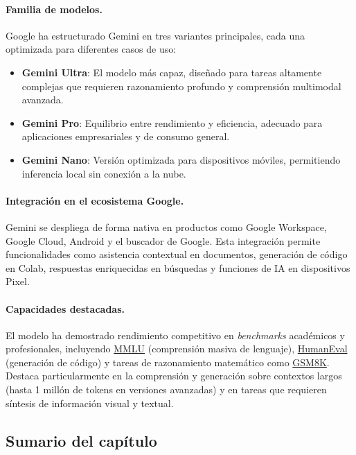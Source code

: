 \documentclass[12pt,a4paper]{report}
\numberwithin{figure}{section}
\begin{document}
\paragraph{Familia de modelos.}
Google ha estructurado Gemini en tres variantes principales, cada una optimizada para diferentes casos de uso:
\begin{itemize}
    \item \textbf{Gemini Ultra}: El modelo más capaz, diseñado para tareas altamente complejas que requieren razonamiento profundo y comprensión multimodal avanzada.
    \item \textbf{Gemini Pro}: Equilibrio entre rendimiento y eficiencia, adecuado para aplicaciones empresariales y de consumo general.
    \item \textbf{Gemini Nano}: Versión optimizada para dispositivos móviles, permitiendo inferencia local sin conexión a la nube.
\end{itemize}

\paragraph{Integración en el ecosistema Google.}
Gemini se despliega de forma nativa en productos como Google Workspace, Google Cloud, Android y el buscador de Google. Esta integración permite funcionalidades como asistencia contextual en documentos, generación de código en Colab, respuestas enriquecidas en búsquedas y funciones de IA en dispositivos Pixel.

\paragraph{Capacidades destacadas.}
El modelo ha demostrado rendimiento competitivo en \textit{benchmarks} académicos y profesionales, incluyendo \href{https://github.com/hendrycks/test}{MMLU} (comprensión masiva de lenguaje), \href{https://github.com/openai/human-eval}{HumanEval} (generación de código) y tareas de razonamiento matemático como \href{https://github.com/openai/grade-school-math}{GSM8K}. Destaca particularmente en la comprensión y generación sobre contextos largos (hasta 1 millón de tokens en versiones avanzadas) y en tareas que requieren síntesis de información visual y textual.

\subsection{Sumario del capítulo}
\label{subsec:sumario_cap2}
\end{document}
